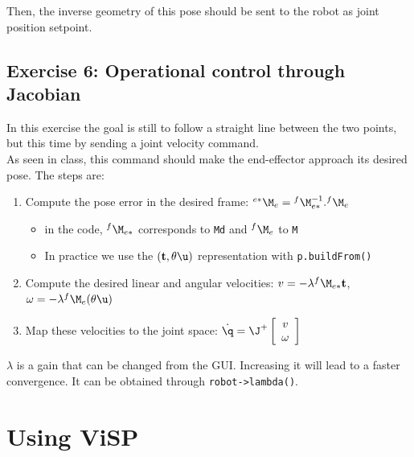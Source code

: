 \documentclass{ecnreport}
\begin{document}
  Then, the inverse geometry of this pose should be sent to the robot as joint position setpoint.
  
  \newpage
  \subsection*{Exercise 6: Operational control through Jacobian}
  
  In this exercise the goal is still to follow a straight line between the two points, but this time by sending a joint velocity command.\\
  
  As seen in class, this command should make the end-effector approach its desired pose. The steps are:
  \begin{enumerate}
    \item Compute the pose error in the desired frame: ${}^{e*}\M_e = {}^{f}\M_{e*}^{-1}.{}^{f}\M_e$
    \begin{itemize}
      \item in the code, ${}^{f}\M_{e*}$ corresponds to \texttt{Md} and ${}^{f}\M_e$ to \texttt{M} 
      \item In practice we use the $(\mathbf{t}, \theta\u)$ representation with \texttt{p.buildFrom()}
    \end{itemize}
    \item Compute the desired linear and angular velocities: $v = -\lambda{}^{f}\M_{e*}\mathbf{t}$, \quad $\omega = -\lambda{}^{f}\M_{e} (\theta\u)$
    \item Map these velocities to the joint space: $\dot\q = \J^+ \left[\begin{array}{c}v\\\omega\end{array}\right]$
  \end{enumerate}
  $\lambda$ is a gain that can be changed from the GUI. Increasing it will lead to a faster convergence. It can be obtained through \texttt{robot->lambda()}.
  
  
  
  \appendix
  
  
  \newpage
  
  \section{Using ViSP}\label{visp}
  
\end{document}
